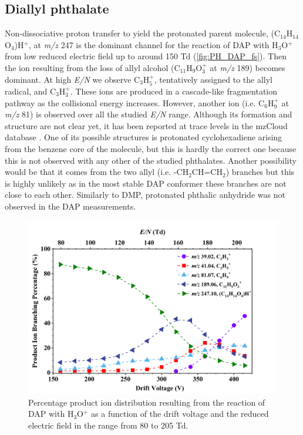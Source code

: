

\subsection{Diallyl phthalate}
%


Non-dissociative proton transfer to yield the protonated parent molecule, (C$_{14}$H$_{14}$O$_4$)H$^+$, at \textit{m/z} 247 is the dominant channel for the reaction of DAP with H$_3$O$^+$ from low reduced electric field up to around 150 Td (\autoref{fig:PH_DAP_fs}). Then the ion resulting from the loss of allyl alcohol (C$_{11}$H$_9$O$_3^+$ at \textit{m/z} 189) becomes dominant. At high \textit{E/N} we observe C$_3$H$_5^+$, tentatively assigned to  the allyl radical,  and C$_3$H$_3^+$.
%
These ions are produced in a cascade-like fragmentation pathway as the collisional energy increases.
%
However, another ion (i.e. C$_6$H$_9^+$ at \textit{m/z} 81) is observed over all the studied \textit{E/N} range.
%
Although its formation and structure are not clear yet, it has been reported at trace levels in the mzCloud database \cite{mzcloudDAP}.
%
One of its possible structures is protonated cyclohexadiene arising from the benzene core of the molecule, but this is hardly the correct one because this  is not observed with any other of the studied phthalates.
%
Another possibility would be that it comes from the two allyl (i.e. -CH$_2$CH=CH$_2$) branches but this is highly unlikely as in the most stable DAP conformer these branches are not close to each other.
%
Similarly to DMP, protonated phthalic anhydride was not observed in the DAP measurements.
%
\begin{figure}[htb]%
\centering
\includegraphics[height=0.35\textheight]{pics/DAP-BR.png}
\caption{Percentage product ion distribution resulting from the reaction of DAP with H$_3$O$^+$ as a function of the drift voltage and the reduced electric field in the range from 80 to 205 Td.}
\label{fig:PH_DAP_fs}
\end{figure}
